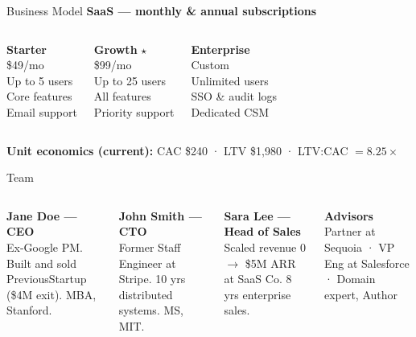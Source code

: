 \documentclass[aspectratio=169]{beamer}
\begin{document}
\begin{frame}{Business Model}
  \textbf{SaaS --- monthly \& annual subscriptions}

  \begin{columns}[T]
    \centering
    \textbf{Starter}\\
    \$49/mo\\[0.4em]
    {\small Up to 5 users\\Core features\\Email support}

    \centering
    \alert{\textbf{Growth}} \alert{$\star$}\\
    \$99/mo\\[0.4em]
    {\small Up to 25 users\\All features\\Priority support}

    \centering
    \textbf{Enterprise}\\
    Custom\\[0.4em]
    {\small Unlimited users\\SSO \& audit logs\\Dedicated CSM}
  \end{columns}

  \vspace{0.8em}
  \textbf{Unit economics (current):} CAC \$240 · LTV \$1{,}980 · LTV:CAC $= 8.25\times$
\end{frame}

\begin{frame}{Team}
  \begin{columns}[T]
    \textbf{Jane Doe --- CEO}\\
    {\small Ex-Google PM. Built and sold PreviousStartup (\$4M exit). MBA, Stanford.}

    \vspace{0.8em}
    \textbf{John Smith --- CTO}\\
    {\small Former Staff Engineer at Stripe. 10 yrs distributed systems. MS, MIT.}

    \textbf{Sara Lee --- Head of Sales}\\
    {\small Scaled revenue 0 $\to$ \$5M ARR at SaaS Co. 8 yrs enterprise sales.}

    \vspace{0.8em}
    \textbf{Advisors}\\
    {\small Partner at Sequoia · VP Eng at Salesforce · Domain expert, Author}
  \end{columns}
\end{frame}
\end{document}
